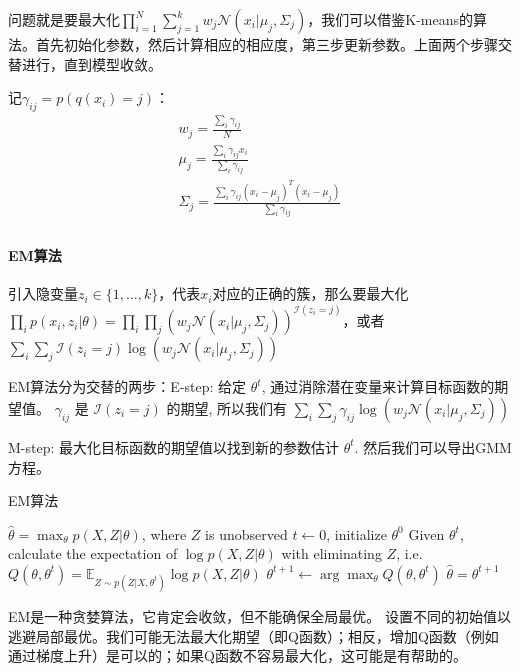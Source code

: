 问题就是要最大化$\prod_{i=1}^N \sum_{j=1}^k w_j \mathcal{N}(x_i|\mu_j, \Sigma_j)$，我们可以借鉴K-means的算法。首先初始化参数，然后计算相应的相应度，第三步更新参数。上面两个步骤交替进行，直到模型收敛。

记$\gamma_{ij} = p(q(x_i) = j)$：$$
\begin{aligned}
    w_j = \frac{\sum_i \gamma_{ij}}{N} \\
    \mu_j = \frac{\sum_i \gamma_{ij}x_i}{\sum_i \gamma_{ij}} \\
    \Sigma_j = \frac{\sum_i \gamma_{ij}(x_i - \mu_j)^T(x_i - \mu_j)}{\sum_i \gamma_{ij}} \\
\end{aligned}
$$

\paragraph{EM算法}
引入隐变量$z_i \in \{1, \ldots, k\}$，代表$x_i$对应的正确的簇，那么要最大化$\prod_i p(x_i, z_i|\theta) = \prod_i \prod_j (w_j\mathcal{N}(x_i|\mu_j, \Sigma_j))^{\mathcal{I}(z_i =j)}$，或者$\sum_i \sum_j \mathcal{I}(z_i =j)\log(w_j\mathcal{N}(x_i|\mu_j, \Sigma_j))$

EM算法分为交替的两步：E-step: 给定 $\theta^t$, 通过消除潜在变量来计算目标函数的期望值。 $\gamma_{ij}$ 是 $\mathcal{I}(z_i = j)$ 的期望, 所以我们有 $\sum_i\sum_j \gamma_{ij} \log(w_j\mathcal{N}(x_i|\mu_j, \Sigma_j))$

M-step: 最大化目标函数的期望值以找到新的参数估计 $\theta^t$. 然后我们可以导出GMM方程。

\begin{algorithm}[H]
\caption{EM算法}
\label{alg:EM}
\begin{algorithmic}[1]
\Require $\hat{\theta} = \max_\theta p(X,Z|\theta)$, where $Z$ is unobserved
\State $t \leftarrow 0$, initialize $\theta^0$
\Repeat
\State Given $\theta^t$, calculate the expectation of $\log p(X, Z|\theta)$ with eliminating $Z$, i.e. $Q(\theta, \theta^t) = \mathbb{E}_{Z\sim p(Z|X, \theta^t)}\log p(X, Z|\theta)$
\State $\theta^{t+1} \leftarrow \arg \max_{\theta} Q(\theta, \theta^t)$
\State $\hat{\theta} = \theta^{t+1}$
\end{algorithmic}
\end{algorithm}

EM是一种贪婪算法，它肯定会收敛，但不能确保全局最优。
设置不同的初始值以逃避局部最优。我们可能无法最大化期望（即Q函数）；相反，增加Q函数（例如通过梯度上升）是可以的；如果Q函数不容易最大化，这可能是有帮助的。

